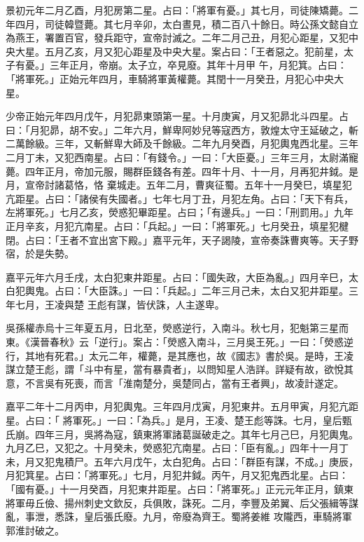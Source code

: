 \begin{pinyinscope}
 景初元年二月乙酉，月犯房第二星。占曰：「將軍有憂。」其七月，司徒陳矯薨。二年四月，司徒韓暨薨。其七月辛卯，太白晝見，積二百八十餘日。時公孫文懿自立為燕王，署置百官，發兵距守，宣帝討滅之。二年二月己丑，月犯心距星，又犯中央大星。五月乙亥，月又犯心距星及中央大星。案占曰：「王者惡之。犯前星，太子有憂。」三年正月，帝崩。太子立，卒見廢。其年十月甲
 午，月犯箕。占曰：「將軍死。」正始元年四月，車騎將軍黃權薨。其閏十一月癸丑，月犯心中央大星。



 少帝正始元年四月戊午，月犯昴東頭第一星。十月庚寅，月又犯昴北斗四星。占曰：「月犯昴，胡不安。」二年六月，鮮卑阿妙兒等寇西方，敦煌太守王延破之，斬二萬餘級。三年，又斬鮮卑大師及千餘級。二年九月癸酉，月犯輿鬼西北星。三年二月丁未，又犯西南星。占曰：「有錢令。」一曰：「大臣憂。」三年三月，太尉滿寵薨。四年正月，帝加元服，賜群臣錢各有差。四年十月、十一月，月再犯井鉞。是月，宣帝討諸葛恪，恪
 棄城走。五年二月，曹爽征蜀。五年十一月癸巳，填星犯亢距星。占曰：「諸侯有失國者。」七年七月丁丑，月犯左角。占曰：「天下有兵，左將軍死。」七月乙亥，熒惑犯畢距星。占曰；「有邊兵。」一曰：「刑罰用。」九年正月辛亥，月犯亢南星。占曰：「兵起。」一曰：「將軍死。」七月癸丑，填星犯楗閉。占曰：「王者不宜出宮下殿。」嘉平元年，天子謁陵，宣帝奏誅曹爽等。天子野宿，於是失勢。



 嘉平元年六月壬戌，太白犯東井距星。占曰：「國失政，大臣為亂。」四月辛巳，太白犯輿鬼。占曰：「大臣誅。」一曰：「兵起。」二年三月己未，太白又犯井距星。三年七月，王凌與楚
 王彪有謀，皆伏誅，人主遂卑。



 吳孫權赤烏十三年夏五月，日北至，熒惑逆行，入南斗。秋七月，犯魁第三星而東。《漢晉春秋》云「逆行」。案占：「熒惑入南斗，三月吳王死。」一曰：「熒惑逆行，其地有死君。」太元二年，權薨，是其應也，故《國志》書於吳。是時，王凌謀立楚王彪，謂「斗中有星，當有暴貴者」，以問知星人浩詳。詳疑有故，欲悅其意，不言吳有死喪，而言「淮南楚分，吳楚同占，當有王者興」，故凌計遂定。



 嘉平二年十二月丙申，月犯輿鬼。三年四月戊寅，月犯東井。五月甲寅，月犯亢距星。占曰：「
 將軍死。」一曰：「為兵。」是月，王凌、楚王彪等誅。七月，皇后甄氏崩。四年三月，吳將為寇，鎮東將軍諸葛誕破走之。其年七月己巳，月犯輿鬼。九月乙巳，又犯之。十月癸未，熒惑犯亢南星。占曰：「臣有亂。」四年十一月丁未，月又犯鬼積尸。五年六月戊午，太白犯角。占曰：「群臣有謀，不成。」庚辰，月犯箕星。占曰：「將軍死。」七月，月犯井鉞。丙午，月又犯鬼西北星。占曰：「國有憂。」十一月癸酉，月犯東井距星。占曰：「將軍死。」正元元年正月，鎮東將軍毋丘儉、揚州刺史文欽反，兵俱敗，誅死。二月，李豐及弟翼、后父張緝等謀亂，事泄，悉誅，皇后張氏廢。九月，帝廢為齊王。蜀將姜維
 攻隴西，車騎將軍郭淮討破之。




\end{pinyinscope}
